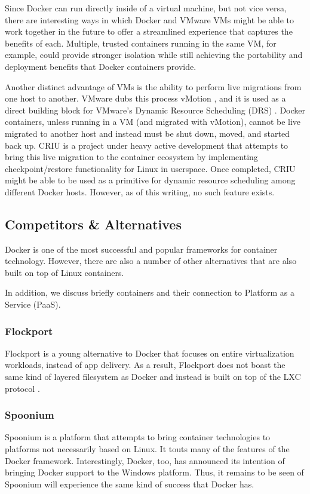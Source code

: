 Since Docker can run directly inside of a virtual machine, but not vice versa, there are interesting ways in which Docker and VMware VMs might be able to work together in the future to offer a streamlined experience that captures the benefits of each. Multiple, trusted containers running in the same VM, for example, could provide stronger isolation while still achieving the portability and deployment benefits that Docker containers provide.

Another distinct advantage of VMs is the ability to perform live migrations from one host to another. VMware dubs this process vMotion \cite{vmotion}, and it is used as a direct building block for VMware's Dynamic Resource Scheduling (DRS) \cite{DRS}. Docker containers, unless running in a VM (and migrated with vMotion), cannot be live migrated to another host and instead must be shut down, moved, and started back up. CRIU \cite{CRIU} is a project under heavy active development that attempts to bring this live migration to the container ecosystem by implementing checkpoint/restore functionality for Linux in userspace. Once completed, CRIU might be able to be used as a primitive for dynamic resource scheduling among different Docker hosts. However, as of this writing, no such feature exists.
\subsection{Competitors \& Alternatives}
Docker is one of the most successful and popular frameworks for container technology. However, there are also a number of other alternatives that are also built on top of Linux containers. 

In addition, we discuss briefly containers and their connection to Platform as a Service (PaaS).
\subsubsection{Flockport}
Flockport is a young alternative to Docker that focuses on entire virtualization workloads, instead of app delivery. As a result, Flockport does not boast the same kind of layered filesystem as Docker and instead is built on top of the LXC protocol \cite{flockport}.

\subsubsection{Spoonium}
Spoonium is a platform that attempts to bring container technologies to platforms not necessarily based on Linux. It touts many of the features of the Docker framework. Interestingly, Docker, too, has announced its intention of bringing Docker support to the Windows platform. Thus, it remains to be seen of Spoonium will experience the same kind of success that Docker has.

